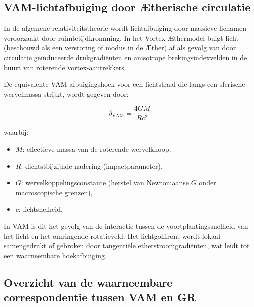 \subsection*{VAM-lichtafbuiging door Ætherische circulatie}

    In de algemene relativiteitstheorie wordt lichtafbuiging door massieve lichamen veroorzaakt door ruimtetijdkromming. In het Vortex-Æthermodel buigt licht (beschouwd als een verstoring of modus in de Æther) af als gevolg van door circulatie geïnduceerde drukgradiënten en anisotrope brekingsindexvelden in de buurt van roterende vortex-aantrekkers.

    De equivalente VAM-afbuigingshoek voor een lichtstraal die langs een sferische wervelmassa strijkt, wordt gegeven door:

    \begin{equation}
        \delta_{\text{VAM}} =
        \frac{4 G M}{R c^2}
    \end{equation}

    waarbij:
    \begin{itemize}
        \item \( M \): effectieve massa van de roterende wervelknoop,
        \item \( R \): dichtstbijzijnde nadering (impactparameter),
        \item \( G \): wervelkoppelingsconstante (herstel van Newtoniaanse \( G \) onder macroscopische grenzen),
        \item \( c \): lichtsnelheid.
    \end{itemize}

    In VAM is dit het gevolg van de interactie tussen de voortplantingssnelheid van het licht en het omringende rotatieveld. Het lichtgolffront wordt lokaal samengedrukt of gebroken door tangentiële etherstroomgradiënten, wat leidt tot een waarneembare hoekafbuiging.
\subsection*{Overzicht van de waarneembare correspondentie tussen VAM en GR}

